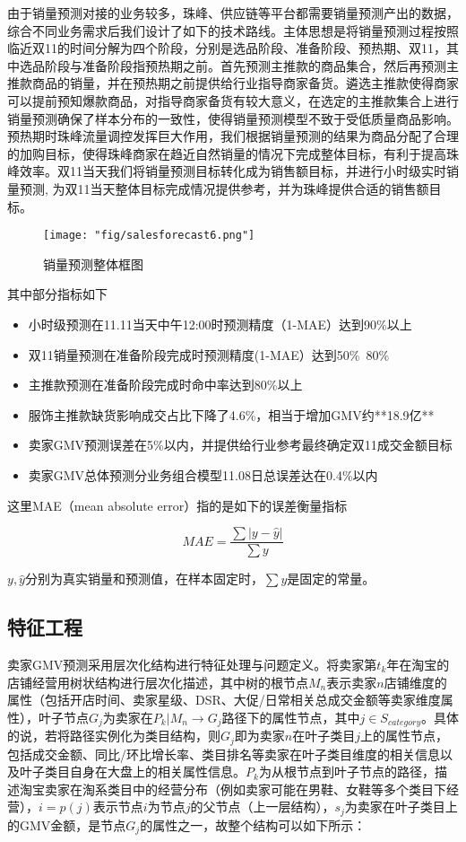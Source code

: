 由于销量预测对接的业务较多，珠峰、供应链等平台都需要销量预测产出的数据，综合不同业务需求后我们设计了如下的技术路线。主体思想是将销量预测过程按照临近双11的时间分解为四个阶段，分别是选品阶段、准备阶段、预热期、双11，其中选品阶段与准备阶段指预热期之前。首先预测主推款的商品集合，然后再预测主推款商品的销量，并在预热期之前提供给行业指导商家备货。遴选主推款使得商家可以提前预知爆款商品，对指导商家备货有较大意义，在选定的主推款集合上进行销量预测确保了样本分布的一致性，使得销量预测模型不致于受低质量商品影响。 预热期时珠峰流量调控发挥巨大作用，我们根据销量预测的结果为商品分配了合理的加购目标，使得珠峰商家在趋近自然销量的情况下完成整体目标，有利于提高珠峰效率。双11当天我们将销量预测目标转化成为销售额目标，并进行小时级实时销量预测, 为双11当天整体目标完成情况提供参考，并为珠峰提供合适的销售额目标。


\begin{figure}[!h]
	\centering
	\texttt{[image: "fig/salesforecast6.png"]}
	\caption{销量预测整体框图}
	\label{fig:sf6}
\end{figure}

其中部分指标如下
\begin{itemize}
\item 小时级预测在11.11当天中午12:00时预测精度（1-MAE）达到90\%以上
\item 双11销量预测在准备阶段完成时预测精度(1-MAE）达到50\%~80\%
\item 主推款预测在准备阶段完成时命中率达到80\%以上
\item 服饰主推款缺货影响成交占比下降了4.6\%，相当于增加GMV约**18.9亿**
\item 卖家GMV预测误差在5\%以内，并提供给行业参考最终确定双11成交金额目标
\item 卖家GMV总体预测分业务组合模型11.08日总误差达在0.4\%以内
\end{itemize}
这里MAE（mean absolute error）指的是如下的误差衡量指标

$$MAE=\frac{\sum{|y-\hat{y}|}}{\sum{y}}$$

$y, \hat{y}$分别为真实销量和预测值，在样本固定时，$\sum{y}$是固定的常量。

\subsection{特征工程}
卖家GMV预测采用层次化结构进行特征处理与问题定义。将卖家第$t_k$年在淘宝的店铺经营用树状结构进行层次化描述，其中树的根节点$M_{n}$表示卖家$n$店铺维度的属性（包括开店时间、卖家星级、DSR、大促/日常相关总成交金额等卖家维度属性），叶子节点$G_{j}$为卖家在$P_k|M_n \rightarrow G_{j}$路径下的属性节点，其中$j \in S_{category}$。具体的说，若将路径实例化为类目结构，则$G_{j}$即为卖家$n$在叶子类目$j$上的属性节点，包括成交金额、同比/环比增长率、类目排名等卖家在叶子类目维度的相关信息以及叶子类目自身在大盘上的相关属性信息。$P_k$为从根节点到叶子节点的路径，描述淘宝卖家在淘系类目中的经营分布（例如卖家可能在男鞋、女鞋等多个类目下经营），$i=p(j)$表示节点$i$为节点$j$的父节点（上一层结构），$s_{j}$为卖家在叶子类目上的GMV金额，是节点$G_{j}$的属性之一，故整个结构可以如下所示：

